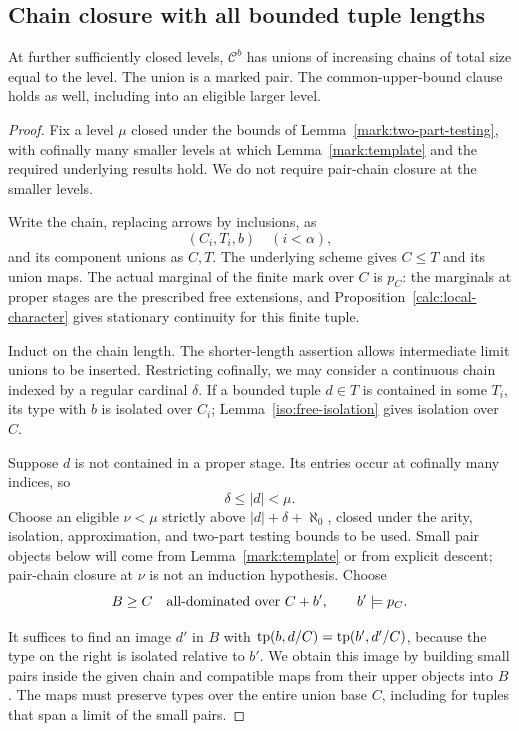 \subsection{Chain closure with all bounded tuple lengths}

\begin{lemma}
\label{mark:chain-closure}
At further sufficiently closed levels, \(\mathcal C^b\)
has unions of increasing chains of total size equal to
the level.  The union is a marked pair.  The
common-upper-bound clause holds as well, including
into an eligible larger level.
\end{lemma}

\begin{proof}
Fix a level \(\mu\) closed under the bounds of
Lemma~\ref{mark:two-part-testing}, with cofinally many
smaller levels at which Lemma~\ref{mark:template} and
the required underlying results hold.  We do not
require pair-chain closure at the smaller levels.

Write the chain, replacing arrows by inclusions, as
\[
                  (C_i,T_i,b)\quad(i<\alpha),
\]
and its component unions as \(C,T\).  The underlying
scheme gives \(C\leq T\) and its union maps.  The
actual marginal of the finite mark over \(C\) is
\(p_C\): the marginals at proper stages are the
prescribed free extensions, and
Proposition~\ref{calc:local-character} gives stationary
continuity for this finite tuple.

Induct on the chain length.  The shorter-length
assertion allows intermediate limit unions to be
inserted.  Restricting cofinally, we may consider
a continuous chain indexed by a regular cardinal
\(\delta\).  If a bounded tuple \(d\in T\) is
contained in some \(T_i\), its type with \(b\) is
isolated over \(C_i\);
Lemma~\ref{iso:free-isolation} gives isolation
over \(C\).

Suppose \(d\) is not contained in a proper stage.
Its entries occur at cofinally many indices, so
\[
                        \delta\leq |d|<\mu.
\]
Choose an eligible \(\nu<\mu\) strictly above
\(|d|+\delta+\aleph_0\), closed under the arity,
isolation, approximation, and two-part testing
bounds to be used.  Small pair objects below
will come from Lemma~\ref{mark:template} or from
explicit descent; pair-chain closure at \(\nu\)
is not an induction hypothesis.  Choose
\[
             B\geq C
       \quad\hbox{all-dominated over }C+b',
       \qquad b'\models p_C .
\]

It suffices to find an image \(d'\) in \(B\) with
\(\operatorname{tp}(b,d/C)=\operatorname{tp}(b',d'/C)\), because the type on the
right is isolated relative to \(b'\).  We obtain this
image by building small pairs inside the given chain
and compatible maps from their upper objects into
\(B\).  The maps must preserve types over the entire
union base \(C\), including for tuples that span a
limit of the small pairs.


\end{proof}
